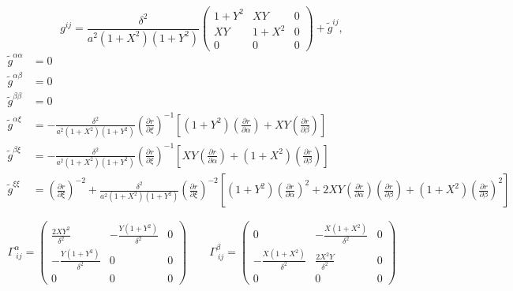 \documentclass[gmdd, hvmath, online]{copernicus_discussions}
\newcommand{\pdiff}[2]{\frac{\partial #1}{\partial #2}}
\begin{document}
\begin{equation}
g^{ij} = \frac{\delta^2}{a^2 (1+X^2) (1+Y^2)} \left( \begin{array}{ccc} 1+Y^2 & X Y & 0 \\[2.0ex] X Y & 1+X^2 & 0 \\[2.0ex] 0 & 0 & 0 \end{array} \right) + \tilde{g}^{ij},
\end{equation}
\begin{align}
\tilde{g}^{\alpha \alpha} &= 0 \\
\tilde{g}^{\alpha \beta} &= 0 \\
\tilde{g}^{\beta \beta} &= 0 \\
\tilde{g}^{\alpha \xi} &= - \frac{\delta^2}{a^2 (1+X^2) (1+Y^2)} \left( \pdiff{r}{\xi} \right)^{-1} \left[ (1+Y^2) \left( \pdiff{r}{\alpha} \right) + X Y \left( \pdiff{r}{\beta} \right) \right] \\
\tilde{g}^{\beta \xi} &= - \frac{\delta^2}{a^2 (1+X^2) (1+Y^2)} \left( \pdiff{r}{\xi} \right)^{-1} \left[ X Y \left( \pdiff{r}{\alpha} \right) + (1+X^2) \left( \pdiff{r}{\beta} \right) \right] \\
\tilde{g}^{\xi \xi} &= \left( \pdiff{r}{\xi} \right)^{-2} + \frac{\delta^2}{a^2 (1+X^2) (1+Y^2)} \left( \pdiff{r}{\xi} \right)^{-2} \left[ (1+Y^2) \left( \pdiff{r}{\alpha} \right)^2 + 2 X Y \left( \pdiff{r}{\alpha} \right) \left( \pdiff{r}{\beta} \right) + (1+X^2) \left( \pdiff{r}{\beta} \right)^2 \right]
\end{align}

\begin{equation}
\Gamma^{\alpha}_{\ i j} = \left( \begin{array}{ccc} \displaystyle \frac{2 X Y^2}{\delta^2} & \displaystyle - \frac{Y (1+Y^2)}{\delta^2} & 0 \\[2.0ex] \displaystyle - \frac{Y (1+Y^2)}{\delta^2} & 0 & 0 \\[2.0ex] 0 & 0 & 0 \end{array} \right) \qquad \Gamma^{\beta}_{\ i j} = \left( \begin{array}{ccc} \displaystyle 0 & \displaystyle - \frac{X (1+X^2)}{\delta^2} & 0 \\[2.0ex] \displaystyle - \frac{X (1+X^2)}{\delta^2} & \displaystyle \frac{2 X^2 Y}{\delta^2} & 0 \\[2.0ex] 0 & 0 & 0 \end{array} \right)
\end{equation}
\end{document}
